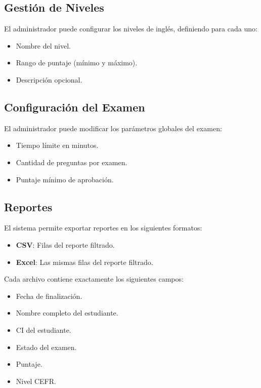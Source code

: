 \subsection{Gestión de Niveles}

El administrador puede configurar los niveles de inglés, definiendo para cada uno:

\begin{itemize}
    \item Nombre del nivel.
    \item Rango de puntaje (mínimo y máximo).
    \item Descripción opcional.
\end{itemize}

\subsection{Configuración del Examen}

El administrador puede modificar los parámetros globales del examen:

\begin{itemize}
    \item Tiempo límite en minutos.
    \item Cantidad de preguntas por examen.
    \item Puntaje mínimo de aprobación.
\end{itemize}

\subsection{Reportes}

El sistema permite exportar reportes en los siguientes formatos:

\begin{itemize}
    \item \textbf{CSV}: Filas del reporte filtrado.
    \item \textbf{Excel}: Las mismas filas del reporte filtrado.
\end{itemize}

Cada archivo contiene exactamente los siguientes campos:

\begin{itemize}
    \item Fecha de finalización.
    \item Nombre completo del estudiante.
    \item CI del estudiante.
    \item Estado del examen.
    \item Puntaje.
    \item Nivel CEFR.
\end{itemize}

